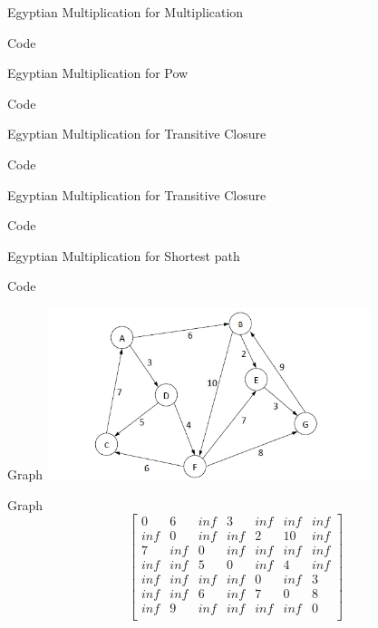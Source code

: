 \documentclass[10pt]{beamer}
\begin{document}
\begin{frame}[fragile]{Egyptian Multiplication for Multiplication}
\begin{block}{Code}\end{block}
\end{frame}

\begin{frame}[fragile]{Egyptian Multiplication for Pow}
\begin{block}{Code}\end{block}
\end{frame}

\begin{frame}[fragile]{Egyptian Multiplication for Transitive Closure}
\begin{block}{Code}\end{block}
\end{frame}

\begin{frame}[fragile]{Egyptian Multiplication for Transitive Closure}
\begin{block}{Code}\end{block}
\end{frame}

\begin{frame}[fragile]{Egyptian Multiplication for Shortest path}
\begin{block}{Code}\end{block}
\end{frame}

\begin{frame}[fragile]{Graph}
\includegraphics[height=5cm]{images/graph.png}
\end{frame}

\begin{frame}[fragile]{Graph}
\[
\begin{bmatrix}
0 &		6	&	inf	&	3	&	inf	&	inf	&	inf	\\
inf	&	0	&	inf	&	inf	&	2	&	10	&	inf	\\
7	&	inf	&	0 &		inf	&	inf	&	inf	&	inf	\\	
inf	&	inf	&	5	&	0	&	inf	&	4	&	inf		\\
inf	&	inf	&	inf	&	inf	&	0	&	inf	&	3		\\
inf	&	inf	&	6	&	inf	&	7	&	0	&	8		\\
inf &	9	 &	inf	&	inf	&	inf	&	inf	&	0 \\
\end{bmatrix}
\]
\end{frame}
\end{document}
